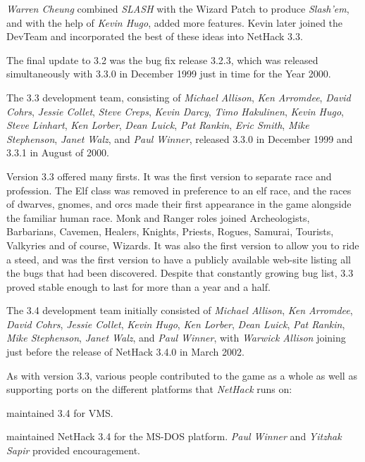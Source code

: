 \medskip
{\it Warren Cheung} combined {\it SLASH} with the Wizard Patch
to produce {\it Slash'em\/}, and
with the help of {\it Kevin Hugo}, added more features.
Kevin later joined the
DevTeam and incorporated the best of these ideas into NetHack 3.3.

\medskip
The final update to 3.2 was the bug fix release 3.2.3, which was released
simultaneously with 3.3.0 in December 1999 just in time for the Year 2000.

\medskip
The 3.3 development team, consisting of {\it Michael Allison}, {\it Ken Arromdee}, 
{\it David Cohrs}, {\it Jessie Collet}, {\it Steve Creps}, {\it Kevin Darcy}, 
{\it Timo Hakulinen}, {\it Kevin Hugo}, {\it Steve Linhart}, {\it Ken Lorber}, 
{\it Dean Luick}, {\it Pat Rankin}, {\it Eric Smith}, {\it Mike Stephenson}, 
{\it Janet Walz}, and {\it Paul Winner}, released 3.3.0 in 
December 1999 and 3.3.1 in August of 2000.

\medskip
Version 3.3 offered many firsts. It was the first version to separate race 
and profession. The Elf class was removed in preference to an elf race, 
and the races of dwarves, gnomes, and orcs made their first appearance in 
the game alongside the familiar human race.  Monk and Ranger roles joined 
Archeologists, Barbarians, Cavemen, Healers, Knights, Priests, Rogues, Samurai, 
Tourists, Valkyries and of course, Wizards.  It was also the first version
to allow you to ride a steed, and was the first version to have a publicly 
available web-site listing all the bugs that had been discovered.  Despite 
that constantly growing bug list, 3.3 proved stable enough to last for
more than a year and a half.

\medskip
The 3.4 development team initially consisted of 
{\it Michael Allison}, {\it Ken Arromdee},
{\it David Cohrs}, {\it Jessie Collet}, {\it Kevin Hugo}, {\it Ken Lorber},
{\it Dean Luick}, {\it Pat Rankin}, {\it Mike Stephenson}, 
{\it Janet Walz}, and {\it Paul Winner}, with {\it  Warwick Allison} joining 
just before the release of NetHack 3.4.0 in March 2002.

\medskip
As with version 3.3, various people contributed to the game as a whole as
well as supporting ports on the different platforms that {\it NetHack\/}
runs on:

\medskip
{} maintained 3.4 for VMS.

\medskip
{} maintained NetHack 3.4 for the MS-DOS platform.
{\it Paul Winner} and {\it Yitzhak Sapir} provided encouragement.

